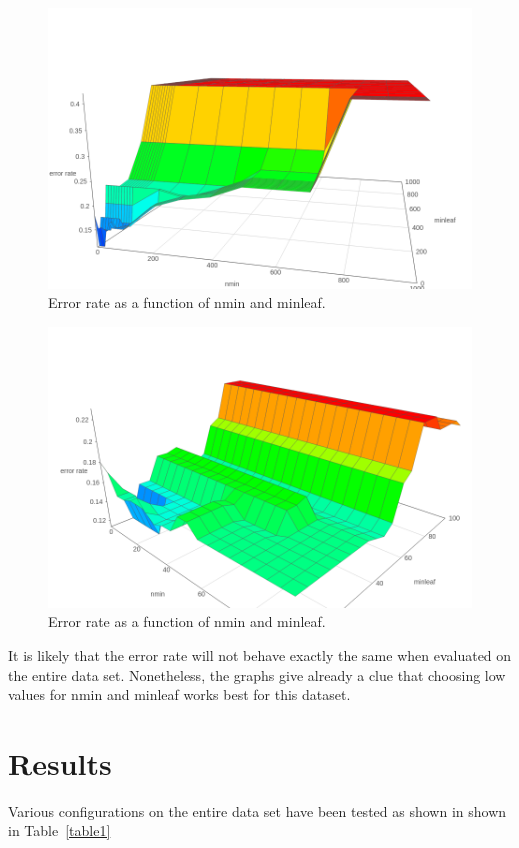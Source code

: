 \documentclass[12pt]{article}
\theoremstyle{definition}
\begin{document}
\begin{figure}[H]
    \centering
    \includegraphics[width=0.8\linewidth]{graph1.png}
    \caption{Error rate as a function of nmin and minleaf.}
\label{fig:graph1}
\end{figure}

\begin{figure}[H]
    \centering
    \includegraphics[width=0.8\linewidth]{graph2.png}
    \caption{Error rate as a function of nmin and minleaf.}
\label{fig:graph2}
\end{figure}


It is likely that the error rate will not behave exactly the same when evaluated on
the entire data set.
Nonetheless, the graphs give already a clue that choosing low values for nmin and minleaf
works best for this dataset.

\section{Results}
\label{sec:results}

Various configurations on the entire data set have been tested as shown in shown in Table~\ref{table1}
\end{document}
